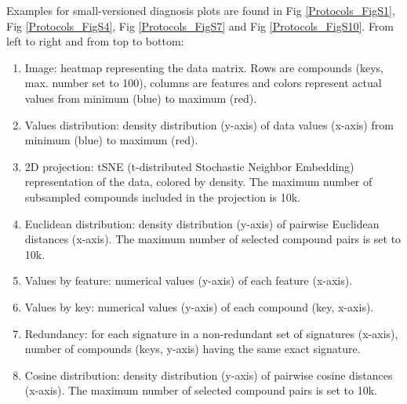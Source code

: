 Examples for small-versioned diagnosis plots are found in Fig \ref{Protocols_FigS1}, Fig \ref{Protocols_FigS4}, Fig \ref{Protocols_FigS7} and Fig \ref{Protocols_FigS10}. From left to right and from top to bottom:
\begin{enumerate}
    \item[\textbullet] Image: heatmap representing the data matrix. Rows are compounds (keys, max. number set to 100), columns are features and colors represent actual values from minimum (blue) to maximum (red).
    \item[\textbullet] Values distribution: density distribution (y-axis) of data values (x-axis) from minimum (blue) to maximum (red). 
    \item[\textbullet] 2D projection: tSNE (t-distributed Stochastic Neighbor Embedding) representation of the data, colored by density. The maximum number of subsampled compounds included in the projection is 10k. 
    \item[\textbullet] Euclidean distribution: density distribution (y-axis) of pairwise Euclidean distances (x-axis). The maximum number of selected compound pairs is set to 10k. 
    \item[\textbullet] Values by feature: numerical values (y-axis) of each feature (x-axis).
    \item[\textbullet] Values by key: numerical values (y-axis) of each compound (key, x-axis).
    \item[\textbullet] Redundancy: for each signature in a non-redundant set of signatures (x-axis), number of compounds (keys, y-axis) having the same exact signature.  
    \item[\textbullet] Cosine distribution: density distribution (y-axis) of pairwise cosine distances (x-axis). The maximum number of selected compound pairs is set to 10k.
\end{enumerate}

